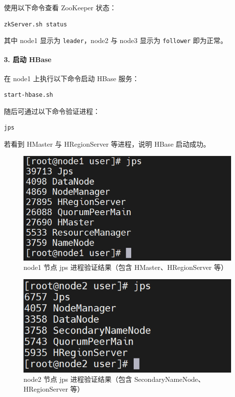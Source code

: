\documentclass[]{bitreport}
\begin{document}
使用以下命令查看 ZooKeeper 状态：
\begin{lstlisting}[style=shell]
zkServer.sh status
\end{lstlisting}

其中 node1 显示为 \texttt{leader}，node2 与 node3 显示为 \texttt{follower} 即为正常。

\paragraph{3. 启动 HBase}
在 node1 上执行以下命令启动 HBase 服务：
\begin{lstlisting}[style=shell]
start-hbase.sh
\end{lstlisting}

随后可通过以下命令验证进程：
\begin{lstlisting}[style=shell]
jps
\end{lstlisting}

若看到 HMaster 与 HRegionServer 等进程，说明 HBase 启动成功。

\begin{figure}[H]
  \centering
  \includegraphics[width=0.8\linewidth]{figures/jps_hbase_node1.png}
  \caption{node1 节点 jps 进程验证结果（包含 HMaster、HRegionServer 等）}
  \label{fig:jps_hbase_node1}
\end{figure}

\begin{figure}[H]
  \centering
  \includegraphics[width=0.8\linewidth]{figures/jps_hbase_node2.png}
  \caption{node2 节点 jps 进程验证结果（包含 SecondaryNameNode、HRegionServer 等）}
  \label{fig:jps_hbase_node2}
\end{figure}
\end{document}
